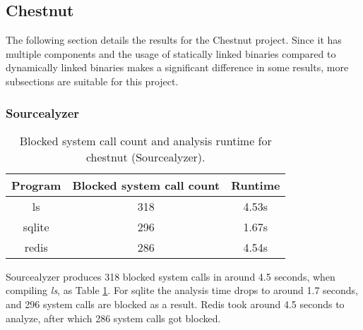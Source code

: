 \subsection {Chestnut}
The following section details the results for the Chestnut project.
Since it has multiple components and the usage of statically linked binaries compared to dynamically linked binaries makes a significant difference in some results, more subsections are suitable for this project.

\subsubsection {Sourcealyzer}
\begin{table}[!h]
\begin{center}
\caption{Blocked system call count and analysis runtime for chestnut (Sourcealyzer).}
\label{tbl:chestnut_src_results}
\begin{tabular}{||c c c||} 
 \hline
 Program & Blocked system call count & Runtime \\
 \hline\hline
 ls & 318 & 4.53s \\ 
 \hline
 sqlite & 296 & 1.67s \\ 
 \hline
 redis & 286 & 4.54s \\ 
 \hline
\end{tabular}
\end{center}
\end{table}
Sourcealyzer produces 318 blocked system calls in around 4.5 seconds, when compiling \textit{ls}, as Table \ref{tbl:chestnut_src_results}.
For sqlite the analysis time drops to around 1.7 seconds, and 296 system calls are blocked as a result.
Redis took around 4.5 seconds to analyze, after which 286 system calls got blocked.

